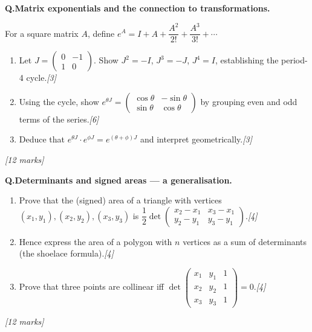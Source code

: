 \documentclass[12pt,a4paper]{article}
\theoremstyle{defstyle}
\newcounter{qnum}
\newcommand{\Q}[1]{\stepcounter{qnum}\medskip\noindent\textbf{Q\theqnum.}\quad #1\par}
\newcommand{\mks}[1]{\hfill\textit{[#1 marks]}}
\begin{document}
\begin{tcolorbox}[explore, title={\color{explorecol}\bfseries Exploration (Beyond Syllabus)}]

\Q{\textbf{Matrix exponentials and the connection to transformations.}

For a square matrix $A$, define $e^A = I + A + \dfrac{A^2}{2!} + \dfrac{A^3}{3!}+\cdots$
\begin{enumerate}[label=(\alph*),itemsep=4pt]
  \item Let $J=\begin{pmatrix}0&-1\\1&0\end{pmatrix}$. Show $J^2=-I$, $J^3=-J$, $J^4=I$, establishing the period-4 cycle.\hfill\textit{[3]}
  \item Using the cycle, show $e^{\theta J}=\begin{pmatrix}\cos\theta&-\sin\theta\\\sin\theta&\cos\theta\end{pmatrix}$ by grouping even and odd terms of the series.\hfill\textit{[6]}
  \item Deduce that $e^{\theta J}\cdot e^{\phi J}=e^{(\theta+\phi)J}$ and interpret geometrically.\hfill\textit{[3]}
\end{enumerate}\mks{12}}

\Q{\textbf{Determinants and signed areas --- a generalisation.}

\begin{enumerate}[label=(\alph*),itemsep=4pt]
  \item Prove that the (signed) area of a triangle with vertices $(x_1,y_1),(x_2,y_2),(x_3,y_3)$ is $\dfrac{1}{2}\det\begin{pmatrix}x_2-x_1&x_3-x_1\\y_2-y_1&y_3-y_1\end{pmatrix}$.\hfill\textit{[4]}
  \item Hence express the area of a polygon with $n$ vertices as a sum of determinants (the shoelace formula).\hfill\textit{[4]}
  \item Prove that three points are collinear iff $\det\begin{pmatrix}x_1&y_1&1\\x_2&y_2&1\\x_3&y_3&1\end{pmatrix}=0$.\hfill\textit{[4]}
\end{enumerate}\mks{12}}

\end{tcolorbox}
\end{document}
